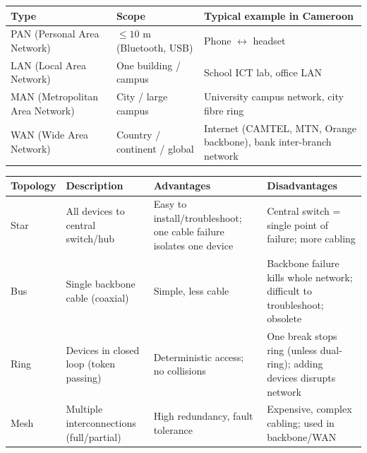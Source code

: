 \documentclass[11pt]{article}
\begin{document}
\begin{aretenir}
\begin{center}
\begin{tabularx}{\linewidth}{|l|X|X|}
\hline
\rowcolor{popblueL} \textbf{Type} & \textbf{Scope} & \textbf{Typical example in Cameroon} \\
\hline
PAN (Personal Area Network) & $\le 10$ m (Bluetooth, USB) & Phone $\leftrightarrow$ headset \\
\hline
LAN (Local Area Network) & One building / campus & School ICT lab, office LAN \\
\hline
MAN (Metropolitan Area Network) & City / large campus & University campus network, city fibre ring \\
\hline
WAN (Wide Area Network) & Country / continent / global & Internet (CAMTEL, MTN, Orange backbone), bank inter-branch network \\
\hline
\end{tabularx}
\end{center}
\end{aretenir}

\begin{aretenir}
\begin{center}
\begin{tabularx}{\linewidth}{|l|X|X|X|}
\hline
\rowcolor{popblueL} \textbf{Topology} & \textbf{Description} & \textbf{Advantages} & \textbf{Disadvantages} \\
\hline
Star & All devices to central switch/hub & Easy to install/troubleshoot; one cable failure isolates one device & Central switch = single point of failure; more cabling \\
\hline
Bus & Single backbone cable (coaxial) & Simple, less cable & Backbone failure kills whole network; difficult to troubleshoot; obsolete \\
\hline
Ring & Devices in closed loop (token passing) & Deterministic access; no collisions & One break stops ring (unless dual-ring); adding devices disrupts network \\
\hline
Mesh & Multiple interconnections (full/partial) & High redundancy, fault tolerance & Expensive, complex cabling; used in backbone/WAN \\
\hline
\end{tabularx}
\end{center}
\end{aretenir}
\end{document}
